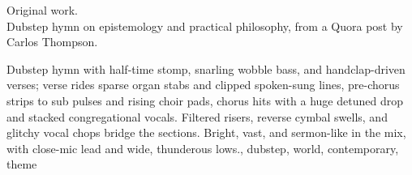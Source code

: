 

\begin{notes}
Original work.\\
Dubstep hymn on epistemology and practical philosophy, from a Quora post by Carlos Thompson.
\end{notes}

\begin{style}
Dubstep hymn with half-time stomp, snarling wobble bass, and handclap-driven verses; verse rides sparse organ stabs and clipped spoken-sung lines, pre-chorus strips to sub pulses and rising choir pads, chorus hits with a huge detuned drop and stacked congregational vocals. %
Filtered risers, reverse cymbal swells, and glitchy vocal chops bridge the sections. %
Bright, vast, and sermon-like in the mix, with close-mic lead and wide, thunderous lows., dubstep, world, contemporary, theme
\end{style}


